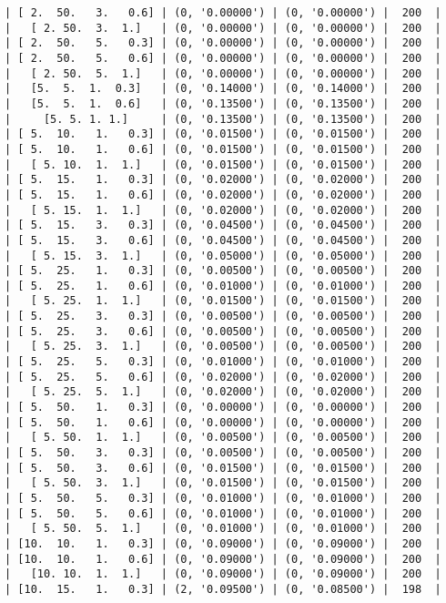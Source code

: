 \documentclass{article}
\begin{document}
\begin{verbatim}
| [ 2.  50.   3.   0.6] | (0, '0.00000') | (0, '0.00000') |  200  |
|   [ 2. 50.  3.  1.]   | (0, '0.00000') | (0, '0.00000') |  200  |
| [ 2.  50.   5.   0.3] | (0, '0.00000') | (0, '0.00000') |  200  |
| [ 2.  50.   5.   0.6] | (0, '0.00000') | (0, '0.00000') |  200  |
|   [ 2. 50.  5.  1.]   | (0, '0.00000') | (0, '0.00000') |  200  |
|   [5.  5.  1.  0.3]   | (0, '0.14000') | (0, '0.14000') |  200  |
|   [5.  5.  1.  0.6]   | (0, '0.13500') | (0, '0.13500') |  200  |
|     [5. 5. 1. 1.]     | (0, '0.13500') | (0, '0.13500') |  200  |
| [ 5.  10.   1.   0.3] | (0, '0.01500') | (0, '0.01500') |  200  |
| [ 5.  10.   1.   0.6] | (0, '0.01500') | (0, '0.01500') |  200  |
|   [ 5. 10.  1.  1.]   | (0, '0.01500') | (0, '0.01500') |  200  |
| [ 5.  15.   1.   0.3] | (0, '0.02000') | (0, '0.02000') |  200  |
| [ 5.  15.   1.   0.6] | (0, '0.02000') | (0, '0.02000') |  200  |
|   [ 5. 15.  1.  1.]   | (0, '0.02000') | (0, '0.02000') |  200  |
| [ 5.  15.   3.   0.3] | (0, '0.04500') | (0, '0.04500') |  200  |
| [ 5.  15.   3.   0.6] | (0, '0.04500') | (0, '0.04500') |  200  |
|   [ 5. 15.  3.  1.]   | (0, '0.05000') | (0, '0.05000') |  200  |
| [ 5.  25.   1.   0.3] | (0, '0.00500') | (0, '0.00500') |  200  |
| [ 5.  25.   1.   0.6] | (0, '0.01000') | (0, '0.01000') |  200  |
|   [ 5. 25.  1.  1.]   | (0, '0.01500') | (0, '0.01500') |  200  |
| [ 5.  25.   3.   0.3] | (0, '0.00500') | (0, '0.00500') |  200  |
| [ 5.  25.   3.   0.6] | (0, '0.00500') | (0, '0.00500') |  200  |
|   [ 5. 25.  3.  1.]   | (0, '0.00500') | (0, '0.00500') |  200  |
| [ 5.  25.   5.   0.3] | (0, '0.01000') | (0, '0.01000') |  200  |
| [ 5.  25.   5.   0.6] | (0, '0.02000') | (0, '0.02000') |  200  |
|   [ 5. 25.  5.  1.]   | (0, '0.02000') | (0, '0.02000') |  200  |
| [ 5.  50.   1.   0.3] | (0, '0.00000') | (0, '0.00000') |  200  |
| [ 5.  50.   1.   0.6] | (0, '0.00000') | (0, '0.00000') |  200  |
|   [ 5. 50.  1.  1.]   | (0, '0.00500') | (0, '0.00500') |  200  |
| [ 5.  50.   3.   0.3] | (0, '0.00500') | (0, '0.00500') |  200  |
| [ 5.  50.   3.   0.6] | (0, '0.01500') | (0, '0.01500') |  200  |
|   [ 5. 50.  3.  1.]   | (0, '0.01500') | (0, '0.01500') |  200  |
| [ 5.  50.   5.   0.3] | (0, '0.01000') | (0, '0.01000') |  200  |
| [ 5.  50.   5.   0.6] | (0, '0.01000') | (0, '0.01000') |  200  |
|   [ 5. 50.  5.  1.]   | (0, '0.01000') | (0, '0.01000') |  200  |
| [10.  10.   1.   0.3] | (0, '0.09000') | (0, '0.09000') |  200  |
| [10.  10.   1.   0.6] | (0, '0.09000') | (0, '0.09000') |  200  |
|   [10. 10.  1.  1.]   | (0, '0.09000') | (0, '0.09000') |  200  |
| [10.  15.   1.   0.3] | (2, '0.09500') | (0, '0.08500') |  198  |

\end{verbatim}
\end{document}
